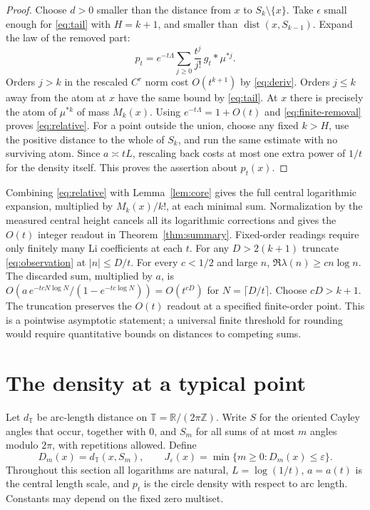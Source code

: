 \documentclass[11pt]{article}
\theoremstyle{remark}\newtheorem{remark}[theorem]{Remark}
\DeclareMathOperator{\dist}{dist}
\begin{document}
\begin{proof}
Choose $d>0$ smaller than the distance from $x$ to $S_k\setminus\{x\}$.
Take $\epsilon$ small enough for \eqref{eq:tail} with $H=k+1$, and
smaller than $\dist(x,S_{k-1})$. Expand the law of the removed part:
\[
 p_t=e^{-t\Lambda}\sum_{j\ge0}\frac{t^j}{j!}\,g_t*\mu^{*j}.
\]
Orders $j>k$ in the rescaled $C^r$ norm cost $O(t^{k+1})$ by
\eqref{eq:deriv}. Orders $j\le k$ away from the atom at $x$ have the
same bound by \eqref{eq:tail}. At $x$ there is precisely the atom of
$\mu^{*k}$ of mass $M_k(x)$. Using $e^{-t\Lambda}=1+O(t)$ and
\eqref{eq:finite-removal} proves \eqref{eq:relative}. For a point outside
the union, choose any fixed $k>H$, use the positive distance to the
whole of $S_k$, and run the same estimate with no surviving atom.
Since $a\asymp tL$, rescaling back costs at most one extra power of $1/t$
for the density itself. This proves the assertion about $p_t(x)$.
\end{proof}
Combining \eqref{eq:relative} with Lemma~\ref{lem:core} gives the full
central logarithmic expansion, multiplied by $M_k(x)/k!$, at each minimal
sum. Normalization by the measured central height cancels all its
logarithmic corrections and gives the $O(t)$ integer readout in
Theorem~\ref{thm:summary}. Fixed-order readings require only finitely many
Li coefficients at each $t$. For any $D>2(k+1)$ truncate
\eqref{eq:observation} at $|n|\le D/t$. For every $c<1/2$ and large $n$,
$\Re\lambda(n)\ge c n\log n$. The discarded sum, multiplied by $a$, is
$O(a\,e^{-tcN\log N}/(1-e^{-tc\log N}))=O(t^{cD})$ for
$N=\lceil D/t\rceil$. Choose $cD>k+1$. The truncation preserves the
$O(t)$ readout at a specified finite-order point. This is a pointwise
asymptotic statement; a universal finite threshold for rounding would
require quantitative bounds on distances to competing sums.

\section{The density at a typical point}
\label{sec:metric}

Let $d_{\mathbb T}$ be arc-length distance on $\mathbb T=\mathbb R/(2\pi\mathbb Z)$.
Write $S$ for the oriented Cayley angles that occur, together with $0$, and $S_m$ for all sums
of at most $m$ angles modulo $2\pi$, with repetitions allowed. Define
\[
  D_m(x)=d_{\mathbb T}(x,S_m),\qquad
  J_{\varepsilon}(x)=\min\{m\ge0:D_m(x)\le\varepsilon\}.
\]
Throughout this section all logarithms are natural, $L=\log(1/t)$, $a=a(t)$
is the central length scale, and $p_t$ is the circle density with respect to
arc length. Constants may depend on the fixed zero multiset.
\end{document}
